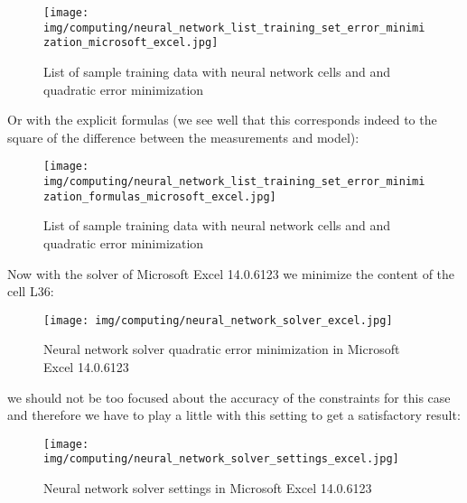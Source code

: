 	\pagebreak
	\begin{tcolorbox}[colframe=black,colback=white,sharp corners]
	\begin{figure}[H]
		\centering
		\texttt{[image: img/computing/neural\_network\_list\_training\_set\_error\_minimization\_microsoft\_excel.jpg]}
		\caption[]{List of sample training data with neural network cells and and quadratic error minimization}
	\end{figure}
	Or with the explicit formulas (we see well that this corresponds indeed to the square of the difference between the measurements and model):
	\begin{figure}[H]
		\centering
		\texttt{[image: img/computing/neural\_network\_list\_training\_set\_error\_minimization\_formulas\_microsoft\_excel.jpg]}
		\caption[]{List of sample training data with neural network cells and and quadratic error minimization}
	\end{figure}
	Now with the solver of Microsoft Excel 14.0.6123 we minimize the content of the cell L36:
	\end{tcolorbox}
	
	\pagebreak
	\begin{tcolorbox}[colframe=black,colback=white,sharp corners]
	\begin{figure}[H]
		\centering
		\texttt{[image: img/computing/neural\_network\_solver\_excel.jpg]}
		\caption[]{Neural network solver quadratic error minimization in Microsoft Excel 14.0.6123}
	\end{figure}
	we should not be too focused about the accuracy of the constraints for this case and therefore we have to play a little with this setting to get a satisfactory result:
	\begin{figure}[H]
		\centering
		\texttt{[image: img/computing/neural\_network\_solver\_settings\_excel.jpg]}
		\caption[]{Neural network solver settings in Microsoft Excel 14.0.6123}
	\end{figure}
	\end{tcolorbox}
	
